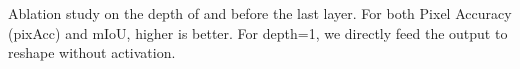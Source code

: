 \caption{Ablation study on the depth of \bottleneckblock{} and \depthwiseblock{} before the last layer. For both Pixel Accuracy (pixAcc) and mIoU, higher is better. For depth=1, we directly feed the output to reshape without activation.}
